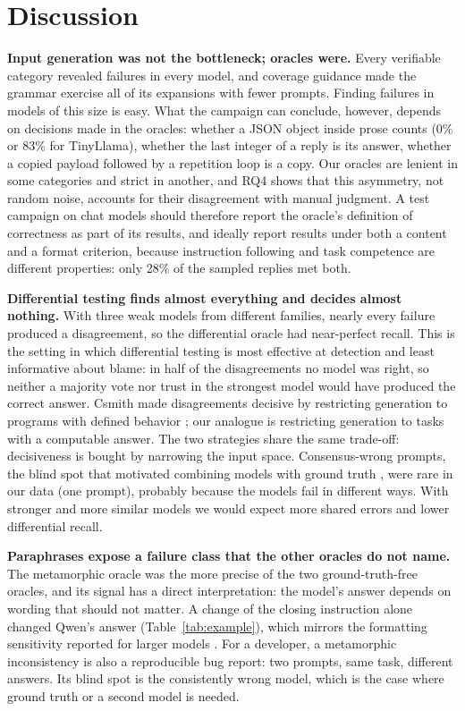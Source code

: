 \section{Discussion}\label{sec:discussion}

\textbf{Input generation was not the bottleneck; oracles were.} Every verifiable category revealed failures in every model, and coverage guidance made the grammar exercise all of its expansions with fewer prompts. Finding failures in models of this size is easy. What the campaign can conclude, however, depends on decisions made in the oracles: whether a JSON object inside prose counts (0\% or 83\% for TinyLlama), whether the last integer of a reply is its answer, whether a copied payload followed by a repetition loop is a copy. Our oracles are lenient in some categories and strict in another, and RQ4 shows that this asymmetry, not random noise, accounts for their disagreement with manual judgment. A test campaign on chat models should therefore report the oracle's definition of correctness as part of its results, and ideally report results under both a content and a format criterion, because instruction following and task competence are different properties: only 28\% of the sampled replies met both.

\textbf{Differential testing finds almost everything and decides almost nothing.} With three weak models from different families, nearly every failure produced a disagreement, so the differential oracle had near-perfect recall. This is the setting in which differential testing is most effective at detection and least informative about blame: in half of the disagreements no model was right, so neither a majority vote nor trust in the strongest model would have produced the correct answer. Csmith made disagreements decisive by restricting generation to programs with defined behavior \citep{yang2011csmith}; our analogue is restricting generation to tasks with a computable answer. The two strategies share the same trade-off: decisiveness is bought by narrowing the input space. Consensus-wrong prompts, the blind spot that motivated combining models with ground truth \citep{zhang2023sac3}, were rare in our data (one prompt), probably because the models fail in different ways. With stronger and more similar models we would expect more shared errors and lower differential recall.

\textbf{Paraphrases expose a failure class that the other oracles do not name.} The metamorphic oracle was the more precise of the two ground-truth-free oracles, and its signal has a direct interpretation: the model's answer depends on wording that should not matter. A change of the closing instruction alone changed Qwen's answer (Table~\ref{tab:example}), which mirrors the formatting sensitivity reported for larger models \citep{sclar2024formatting}. For a developer, a metamorphic inconsistency is also a reproducible bug report: two prompts, same task, different answers. Its blind spot is the consistently wrong model, which is the case where ground truth or a second model is needed.


